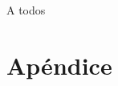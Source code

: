 \documentclass[upright, contnum]{umemoria}
\begin{document}
\begin{thanks} %
A todos
\end{thanks}
\cleardoublepage

\tableofcontents
\listoftables %
\listoffigures %
\listofalgorithms

\mainmatter







\appendix
\chapter{Ap\'endice}






\end{document}
